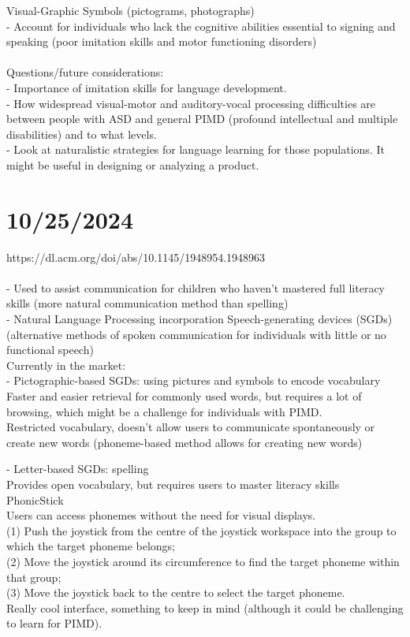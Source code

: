 \documentclass{article}
\begin{document}
	Visual-Graphic Symbols (pictograms, photographs) \\
	- Account for individuals who lack the cognitive abilities essential to signing and speaking (poor imitation skills and motor functioning disorders) \\
	\\
	
	Questions/future considerations:\\
	- Importance of imitation skills for language development.\\
	- How widespread visual-motor and auditory-vocal processing difficulties are between people with ASD and general PIMD (profound intellectual and multiple disabilities) and to what levels.\\
	- Look at naturalistic strategies for language learning for those populations. It might be useful in designing or analyzing a product.\\
	
	\section{10/25/2024}
	https://dl.acm.org/doi/abs/10.1145/1948954.1948963\\\\
	- Used to assist communication for children who haven’t mastered full literacy skills (more natural communication method than spelling) \\
	- Natural Language Processing incorporation
	Speech-generating devices (SGDs) (alternative methods of spoken communication for individuals with little or no functional speech)\\
	
	Currently in the market:\\
	
	- Pictographic-based SGDs: using pictures and symbols to encode vocabulary\\
	Faster and easier retrieval for commonly used words, but requires a lot of browsing, which might be a challenge for individuals with PIMD. \\
	Restricted vocabulary, doesn’t allow users to communicate spontaneously or create new words (phoneme-based method allows for creating new words)
	
	- Letter-based SGDs: spelling\\
	Provides open vocabulary, but requires users to master literacy skills 
	\\
	
	PhonicStick \\
	Users can access phonemes without the need for visual displays.\\
	(1) Push the joystick from the centre of the joystick workspace into the group to which the target phoneme belongs;\\
	(2) Move the joystick around its circumference to find the target phoneme within that group; \\
	(3) Move the joystick back to the centre to select the target phoneme.\\
	Really cool interface, something to keep in mind (although it could be challenging to learn for PIMD).
	
	
	
\end{document}
